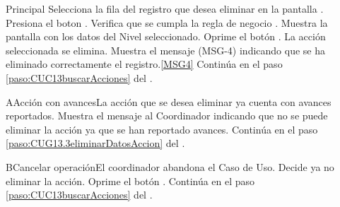 	\begin{UCtrayectoria}{Principal}
			\UCpaso[\UCactor] Selecciona la fila del registro que desea eliminar en la pantalla .
			\UCpaso[\UCactor] Presiona el boton .
			\UCpaso Verifica que se cumpla la regla de negocio . 
			\UCpaso Muestra la pantalla  con los datos del Nivel seleccionado. \label{paso:CUG13.3eliminarDatosAccion}
			\UCpaso [\UCactor] Oprime el botón . 
			\UCpaso La acción seleccionada se elimina.
			\UCpaso Muestra el mensaje (MSG-4) indicando que se ha eliminado correctamente el registro.\ref{MSG4}
			\UCpaso Continúa en el paso \ref{paso:CUC13buscarAcciones} del .
	\end{UCtrayectoria}


		\begin{UCtrayectoriaA}{A}{Acción con avances}{La acción que se desea eliminar ya cuenta con avances reportados.}
			\UCpaso Muestra el mensaje  al Coordinador indicando que no se puede eliminar la acción ya que se han reportado avances.
			\UCpaso Continúa en el paso \ref{paso:CUG13.3eliminarDatosAccion} del .
		\end{UCtrayectoriaA}
		\begin{UCtrayectoriaA}{B}{Cancelar operación}{El coordinador abandona el Caso de Uso.}
			\UCpaso[\UCactor] Decide ya no eliminar la acción.
			\UCpaso[\UCactor] Oprime el botón .
			\UCpaso Continúa en el paso \ref{paso:CUC13buscarAcciones} del .
		\end{UCtrayectoriaA}
		
